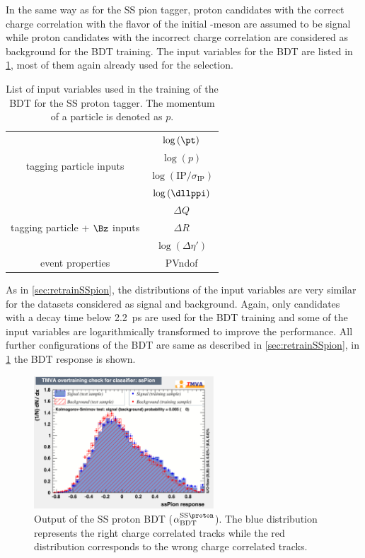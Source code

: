 In the same way as for the SS pion tagger, proton candidates with the correct charge correlation with the flavor of the initial \B-meson are assumed to be signal while proton candidates with the incorrect charge correlation are considered as background for the BDT training.
The input variables for the BDT are listed in \cref{tab:BDTInputSSProton}, most of them again already used for the selection.
\begin{table}[tbp]
	\centering
	\caption{List of input variables used in the training of the BDT for the SS proton tagger.
	The momentum of a particle is denoted as $p$.}
	\begin{tabular}{cc}
		\toprule
		\multirow{4}{*}{tagging particle inputs} 	&	$\log\left(\pt\right)$ \\
													&	$\log\left(p\right)$\\
													&	$\log\left(\text{IP}/\sigma_\text{IP}\right)$\\
													&	$\log\left(\dllppi\right)$\\
		\midrule
		\multirow{3}{*}{tagging particle + $\Bz$ inputs} 	& $\Delta Q$\\
															& $\Delta R$\\
															& $\log\left(\Delta\eta'\right)$\\
		\midrule
		\multirow{1}{*}{event properties} 	& PVndof\\
		\bottomrule
	\end{tabular}
	\label{tab:BDTInputSSProton}
\end{table}
As in \cref{sec:retrainSSpion}, the distributions of the input variables are very similar for the datasets considered as signal and background.
Again, only \B candidates with a decay time below \SI{2.2}{\pico\second} are used for the BDT training and some of the input variables are logarithmically transformed to improve the performance.
All further configurations of the BDT are same as described in \cref{sec:retrainSSpion}, in \cref{fig:SSProtonBDTOutput} the BDT response is shown.
\begin{figure}[htbp]
	\begin{center}
		\includegraphics[width=0.6\textwidth]{08FlavourTagging/figs/SSProton_overtrain.pdf}
	\end{center}
	\caption{Output of the SS proton BDT ($\alpha^{\text{SS}\proton}_\text{BDT}$).
	The blue distribution represents the right charge correlated tracks while the red distribution corresponds to the wrong charge correlated tracks.}
	\label{fig:SSProtonBDTOutput}
\end{figure}
